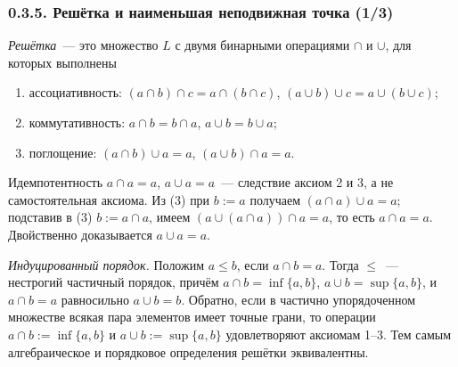 \documentclass[mathserif,12pt,aspectratio=169]{beamer}
\def\emразделенной{\em разделенной}
\renewcommand{\index}[1]{}
\def\em#1{\it\color{blue}#1}
\def\odmkey#1#2{{\it\color{red} #1}\index{#2}}
\def\Assign{\operatorname{:=}}
\let\le\leqslant
\begin{document}
\begin{frame}
\frametitle{0.3.5. Решётка и наименьшая неподвижная точка (1/3)}

\odmkey{Решётка}{Решётка}~--- это множество $L$ с двумя бинарными операциями
$\cap$ и $\cup$, для которых выполнены
\vspace{-4pt}
\begin{enumerate}
\item ассоциативность: $(a\cap b)\cap c=a\cap(b\cap c)$,
$(a\cup b)\cup c=a\cup(b\cup c)$;
\item коммутативность: $a\cap b=b\cap a$, $a\cup b=b\cup a$;
\item поглощение: $(a\cap b)\cup a=a$, $(a\cup b)\cap a=a$.
\end{enumerate}
\vspace{-4pt}

\begin{remark}
Идемпотентность $a\cap a=a$, $a\cup a=a$~--- следствие аксиом 2 и 3, а не
самостоятельная аксиома. Из (3) при $b\Assign a$ получаем $(a\cap a)\cup a=a$;
подставив в (3) $b\Assign a\cap a$, имеем $(a\cup(a\cap a))\cap a=a$, то есть
$a\cap a=a$. Двойственно доказывается $a\cup a=a$.
\end{remark}

{\em Индуцированный порядок.} Положим $a\le b$, если $a\cap b=a$. Тогда $\le$~---
нестрогий частичный порядок, причём $a\cap b=\inf\{a,b\}$, $a\cup b=\sup\{a,b\}$,
и $a\cap b=a$ равносильно $a\cup b=b$. Обратно, если в частично упорядоченном
множестве всякая пара элементов имеет точные грани, то операции
$a\cap b\Assign\inf\{a,b\}$ и $a\cup b\Assign\sup\{a,b\}$ удовлетворяют аксиомам
1--3. Тем самым алгебраическое и порядковое определения решётки эквивалентны.
\end{frame}
\end{document}
